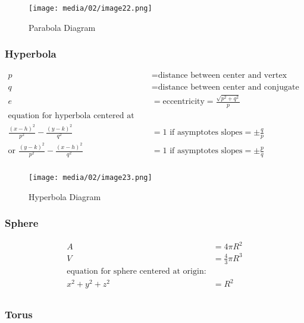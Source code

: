 \documentclass[
]{book}
\begin{document}
\begin{figure}
\centering
\texttt{[image: media/02/image22.png]}
\caption{Parabola Diagram}
\end{figure}

\hypertarget{hyperbola}{%
\subsubsection*{Hyperbola}\label{hyperbola}}

\begin{align}
p &= \text{distance between center and vertex} \\
q &= \text{distance between center and conjugate axis} \\
e &= \text{eccentricity} = \frac{ \sqrt{p^2 +q^2} }{p} \\
\text{equation for hyperbola centered at (h, k):} \\
\frac{(x-h)^2}{p^2} - \frac{(y-k)^2}{q^2} &= 1 \text{ if asymptotes slopes} = \pm \frac{q}{p} \\
\text{or } \frac{(y-k)^2}{p^2} - \frac{(x-h)^2}{q^2} &= 1 \text{ if asymptotes slopes} = \pm \frac{p}{q} \\
\end{align}

\begin{figure}
\centering
\texttt{[image: media/02/image23.png]}
\caption{Hyperbola Diagram}
\end{figure}

\hypertarget{sphere}{%
\subsubsection*{Sphere}\label{sphere}}

\begin{align}
A &= 4 \pi R^2 \\
V &= \frac{4}{3} \pi R^3 \\
\text{equation for sphere centered at origin:} \\
x^2 + y^2 + z^2 &= R^2 \\
\end{align}

\hypertarget{torus}{%
\subsubsection*{Torus}\label{torus}}
\end{document}
